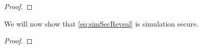 \begin{lemma}
\begin{proof}



	\end{proof}
\end{lemma}

\begin{lemma}
	We will now show that \cref{eq:simSecReveal} is simulation secure.
	\begin{proof}

	\end{proof}
\end{lemma}

